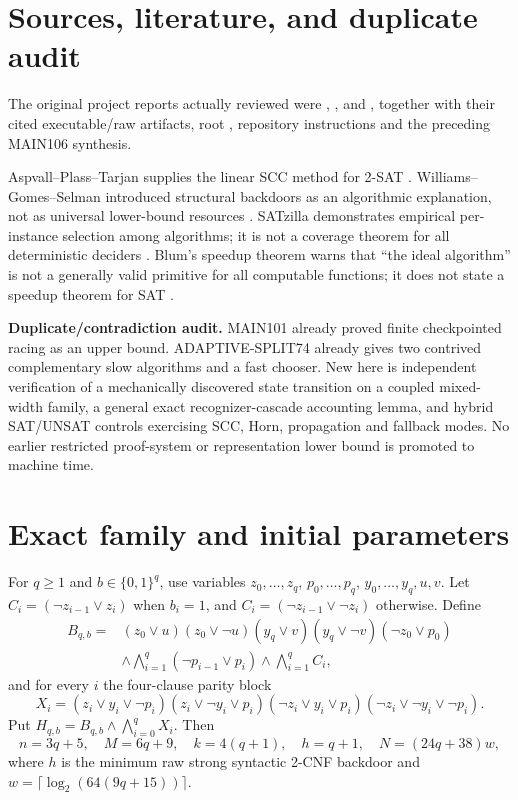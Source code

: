 \documentclass[11pt]{article}
\begin{document}
\section{Sources, literature, and duplicate audit}
The original project reports actually reviewed were
,
, and
,
together with their cited executable/raw artifacts, root ,
repository instructions and the preceding MAIN106 synthesis.

Aspvall--Plass--Tarjan supplies the linear SCC method for 2-SAT
\cite{apt}.  Williams--Gomes--Selman introduced structural backdoors as an
algorithmic explanation, not as universal lower-bound resources
\cite{backdoor}.  SATzilla demonstrates empirical per-instance selection
among algorithms; it is not a coverage theorem for all deterministic
deciders \cite{satzilla}.  Blum's speedup theorem warns that ``the ideal
algorithm'' is not a generally valid primitive for all computable functions;
it does not state a speedup theorem for SAT \cite{blum}.

\textbf{Duplicate/contradiction audit.}  MAIN101 already proved finite
checkpointed racing as an upper bound.  ADAPTIVE-SPLIT74 already gives two
contrived complementary slow algorithms and a fast chooser.  New here is
independent verification of a mechanically discovered state transition on a
coupled mixed-width family, a general exact recognizer-cascade accounting
lemma, and hybrid SAT/UNSAT controls exercising SCC, Horn, propagation and
fallback modes.  No earlier restricted proof-system or representation lower
bound is promoted to machine time.

\section{Exact family and initial parameters}
For $q\ge1$ and $b\in\{0,1\}^q$, use variables
$z_0,\ldots,z_q$, $p_0,\ldots,p_q$, $y_0,\ldots,y_q,u,v$.
Let $C_i=(\neg z_{i-1}\vee z_i)$ when $b_i=1$, and
$C_i=(\neg z_{i-1}\vee\neg z_i)$ otherwise.  Define
\[
\begin{split}
B_{q,b}={}&(z_0\vee u)(z_0\vee\neg u)
(y_q\vee v)(y_q\vee\neg v)(\neg z_0\vee p_0)\\
&\land\bigwedge_{i=1}^q(\neg p_{i-1}\vee p_i)
\land\bigwedge_{i=1}^q C_i,
\end{split}
\]
and for every $i$ the four-clause parity block
\[
X_i=(z_i\vee y_i\vee\neg p_i)(z_i\vee\neg y_i\vee p_i)
(\neg z_i\vee y_i\vee p_i)(\neg z_i\vee\neg y_i\vee\neg p_i).
\]
Put $H_{q,b}=B_{q,b}\land\bigwedge_{i=0}^qX_i$.  Then
\[
n=3q+5,\quad M=6q+9,\quad k=4(q+1),\quad
h=q+1,\quad N=(24q+38)w,
\tag{2}
\]
where $h$ is the minimum raw strong syntactic 2-CNF backdoor and
$w=\lceil\log_2(64(9q+15))\rceil$.
\end{document}
